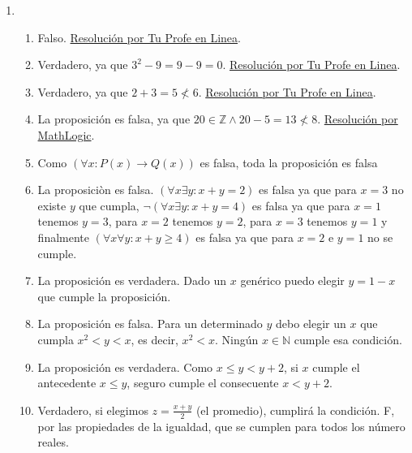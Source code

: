 \documentclass[a4paper]{article}
\newcommand{\exercise}{\item}
\newcommand{\then}{\to}
\begin{document}
\begin{enumerate}
\begin{enumerate} [label=(\alph*)]
		\item Dado el universo $U = \{x ~|~ x$ es una persona$\}$, y los predicados $D(x)$:\textit{"$x$ duerme"}, $S(x)$:\textit{"$x$ tiene sueño"}, $J(x)$:\textit{"$x$ es joven"}, $A(x)$:\textit{"$x$ es arquitecto"}, $R(x)$:\textit{"$x$ escucha la radio"} y $C(x)$:\textit{"$x$ usa la computadora"}. Se simboliza $\neg D(Ana)$, $\forall x:S(x) \then  D(x)$, $\exists x: J(x) \land  S(x)$, $\forall x: A(x) \land  \neg S(x) \then  R(x)$, $\forall x: J(x) \then  S(x) \lor  C(x) $, $A(Marcos) \land  C(Marcos)$, $\neg \left(\exists x: R(x) \land  C(x) \right)$ y finalmente $\exists x: \neg A(x) \land  R(x) \land  S(x) $.
\end{enumerate}\exercise\begin{enumerate} [label=(\alph*)]		\item Falso. \href{https://youtu.be/ChfOh0xG7Ok?t=305}{Resolución por Tu Profe en Linea}.
		\item Verdadero, ya que $3^2-9=9-9=0$. \href{https://youtu.be/ChfOh0xG7Ok?t=460}{Resolución por Tu Profe en Linea}.
		\item Verdadero, ya que $2 + 3 = 5 \nless 6$. \href{https://youtu.be/ChfOh0xG7Ok?t=557}{Resolución por Tu Profe en Linea}.
		\item La proposición es falsa, ya que $20 \in \mathbb{Z} \land 20-5 = 13 \nless 8$. \href{https://youtu.be/rnaCiSpVtP4?t=303}{Resolución por MathLogic}.
		\item Como $\left(\forall x: P(x) \then  Q(x) \right)$ es falsa, toda la proposición es falsa
		\item La proposiciòn es falsa. $\left(\forall x \exists y: x+y = 2 \right)$ es falsa ya que para $x=3$ no existe $y$ que cumpla, $\neg \left(\forall x \exists y: x+y = 4 \right)$ es falsa ya que para $x=1$ tenemos $y=3$, para $x=2$ tenemos $y=2$, para $x=3$ tenemos $y=1$ y finalmente $\left(\forall x \forall y: x+y \geq  4 \right)$ es falsa ya que para $x=2$ e $y=1$ no se cumple. 
		\item La proposición es verdadera. Dado un $x$ genérico puedo elegir $y=1-x$ que cumple la proposición. 
		\item La proposición es falsa. Para un determinado $y$ debo elegir un $x$ que cumpla $x^2 < y < x$, es decir, $x^2 < x$. Ningún $x \in \mathbb{N}$ cumple esa condición.
		\item La proposición es verdadera. Como $x \leq y < y+2$, si $x$ cumple el antecedente $x \leq  y$, seguro cumple el consecuente $x < y+2$. 
		\item Verdadero, si elegimos $z=\displaystyle\frac{x+y}{2}$ (el promedio), cumplirá la condición. F, por las propiedades de la igualdad, que se cumplen para todos los número reales.

\end{enumerate}
\end{enumerate}
\end{document}
